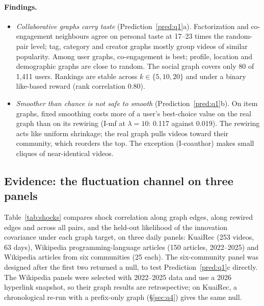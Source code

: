 \documentclass[11pt]{article}
\theoremstyle{definition}
\theoremstyle{remark}
\begin{document}
\paragraph{Findings.}
\begin{itemize}
\item \emph{Collaborative graphs carry taste} (Prediction~\ref{pred:q1}a). Factorization and co-engagement neighbours agree on personal taste at 17--23 times the random-pair level; tag, category and creator graphs mostly group videos of similar popularity. Among user graphs, co-engagement is best; profile, location and demographic graphs are close to random. The social graph covers only 80 of 1,411 users. Rankings are stable across $k\in\{5,10,20\}$ and under a binary like-based reward (rank correlation 0.80).
\item \emph{Smoother than chance is not safe to smooth} (Prediction~\ref{pred:q1}b). On item graphs, fixed smoothing costs more of a user's best-choice value on the real graph than on its rewiring (I-mf at $\lambda=10$: 0.117 against 0.019). The rewiring acts like uniform shrinkage; the real graph pulls videos toward their community, which reorders the top. The exception (I-coauthor) makes small cliques of near-identical videos.
\end{itemize}

\subsection{Evidence: the fluctuation channel on three panels}

Table~\ref{tab:shocks} compares shock correlation along graph edges, along rewired edges and across all pairs, and the held-out likelihood of the innovation covariance under each graph target, on three daily panels: KuaiRec (253 videos, 63 days), Wikipedia programming-language articles (150 articles, 2022--2025) and Wikipedia articles from six communities (25 each). The six-community panel was designed after the first two returned a null, to test Prediction~\ref{pred:q1}c directly. The Wikipedia panels were selected with 2022--2025 data and use a 2026 hyperlink snapshot, so their graph results are retrospective; on KuaiRec, a chronological re-run with a prefix-only graph (\S\ref{sec:q4}) gives the same null.
\end{document}
